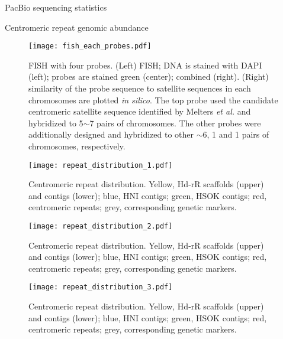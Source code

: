 \begin{table}[htbp]
  \centering
  \caption{PacBio sequencing statistics}
  
  \label{sequencing_stats}
\end{table}


\begin{table}[htbp]
  \centering
  \caption{Centromeric repeat genomic abundance}
  
  \label{centromeric_repeat_genomic_abundance}
\end{table}


\begin{figure}[p]
  \centering
  \texttt{[image: fish\_each\_probes.pdf]}
  \caption{
    FISH with four probes. (Left) FISH; DNA is stained with DAPI (left); probes are stained green (center); combined (right). (Right) similarity of the probe sequence to satellite sequences in each chromosomes are plotted \textit{in silico}. The top probe used the candidate centromeric satellite sequence identified by Melters \textit{et al.} \cite{Melters2013} and hybridized to 5$\sim$7 pairs of chromosomes. The other probes were additionally designed and hybridized to other $\sim$6, 1 and 1 pairs of chromosomes, respectively.
  }
  \label{fish_each}
\end{figure}


\begin{figure}[p]
  \centering
  \texttt{[image: repeat\_distribution\_1.pdf]}
  \caption{
    Centromeric repeat distribution. Yellow, Hd-rR scaffolds (upper) and contigs (lower); blue, HNI contigs; green, HSOK contigs; red, centromeric repeats; grey, corresponding genetic markers.
  }
  \label{fig:repeat_distribution}
\end{figure}

\addtocounter{figure}{-1}
\begin{figure}[p]
  \centering
  \texttt{[image: repeat\_distribution\_2.pdf]}
  \caption{
    Centromeric repeat distribution. Yellow, Hd-rR scaffolds (upper) and contigs (lower); blue, HNI contigs; green, HSOK contigs; red, centromeric repeats; grey, corresponding genetic markers.
  }
  \label{fig:repeat_distribution}
\end{figure}

\addtocounter{figure}{-1}
\begin{figure}[p]
  \centering
  \texttt{[image: repeat\_distribution\_3.pdf]}
  \caption{
    Centromeric repeat distribution. Yellow, Hd-rR scaffolds (upper) and contigs (lower); blue, HNI contigs; green, HSOK contigs; red, centromeric repeats; grey, corresponding genetic markers.
  }
  \label{fig:repeat_distribution}
\end{figure}


